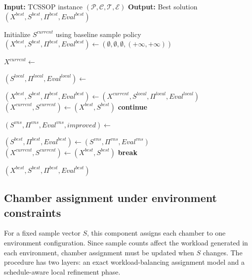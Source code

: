\documentclass[11pt]{article}
\begin{document}
\begin{algorithm}[H]
\caption{Overall Solution Framework for TCSSOP}
\label{alg:general_framework_tcssop_final}
\begin{algorithmic}[1]

\State \textbf{Input:} TCSSOP instance $(\mathcal{P}, \mathcal{C}, \mathcal{T}, \mathcal{E})$
\State \textbf{Output:} Best solution $(X^{best}, S^{best}, \Pi^{best}, Eval^{best})$

\State Initialize $S^{current}$ using baseline sample policy
\State $(X^{best}, S^{best}, \Pi^{best}, Eval^{best}) \gets (\emptyset, \emptyset, \emptyset, (+\infty,+\infty))$


    \State $X^{current} \gets$ 

    \State $(S^{local}, \Pi^{local}, Eval^{local}) \gets$

        \State $(X^{best}, S^{best}, \Pi^{best}, Eval^{best}) \gets (X^{current}, S^{local}, \Pi^{local}, Eval^{local})$
        \State $(X^{current}, S^{current}) \gets (X^{best}, S^{best})$
        \State \textbf{continue}
    \EndIf

    \State $(S^{vns}, \Pi^{vns}, Eval^{vns}, improved) \gets$

        \State $(S^{best}, \Pi^{best}, Eval^{best}) \gets (S^{vns}, \Pi^{vns}, Eval^{vns})$
        \State $(X^{current}, S^{current}) \gets (X^{best}, S^{best})$
    \Else
        \State \textbf{break}
    \EndIf

\EndFor

\State \Return $(X^{best}, S^{best}, \Pi^{best}, Eval^{best})$

\end{algorithmic}
\end{algorithm}

\subsection{Chamber assignment under environment constraints}
\label{subsec:chamber_assignment}

For a fixed sample vector \(S\), this component assigns each chamber to one environment configuration. Since sample counts affect the workload generated in each environment, chamber assignment must be updated when \(S\) changes. The procedure has two layers: an exact workload-balancing assignment model and a schedule-aware local refinement phase.
\end{document}

